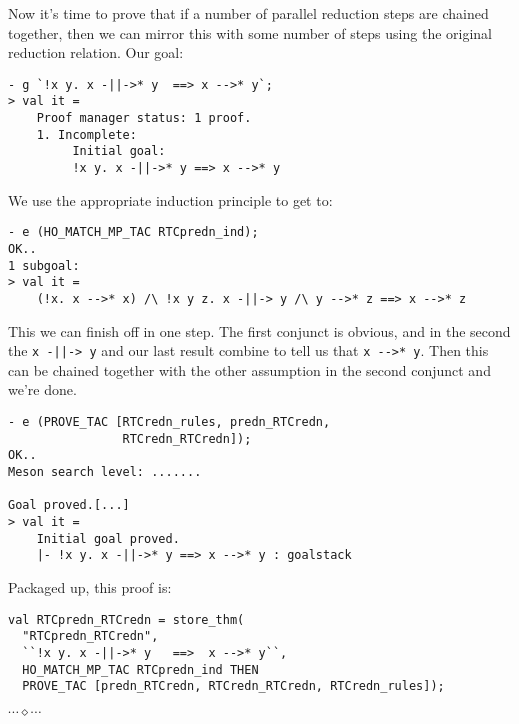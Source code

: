 \documentclass[12pt]{article}
\newcommand{\eos}{\hfill{}$\cdots\diamond\cdots$\hfill{}\vspace{5mm}}
\begin{document}
Now it's time to prove that if a number of parallel reduction steps
are chained together, then we can mirror this with some number of
steps using the original reduction relation.  Our goal:
\begin{session}\begin{verbatim}
- g `!x y. x -||->* y  ==> x -->* y`;
> val it =
    Proof manager status: 1 proof.
    1. Incomplete:
         Initial goal:
         !x y. x -||->* y ==> x -->* y
\end{verbatim}\end{session}
We use the appropriate induction principle to get to:
\begin{session}\begin{verbatim}
- e (HO_MATCH_MP_TAC RTCpredn_ind);
OK..
1 subgoal:
> val it =
    (!x. x -->* x) /\ !x y z. x -||-> y /\ y -->* z ==> x -->* z
\end{verbatim}\end{session}
This we can finish off in one step.  The first conjunct is obvious,
and in the second the \verb!x -||-> y! and our last result combine to
tell us that \verb!x -->* y!.  Then this can be chained together with
the other assumption in the second conjunct and we're done.
\begin{session}\begin{verbatim}
- e (PROVE_TAC [RTCredn_rules, predn_RTCredn,
                RTCredn_RTCredn]);
OK..
Meson search level: .......

Goal proved.[...]
> val it =
    Initial goal proved.
    |- !x y. x -||->* y ==> x -->* y : goalstack
\end{verbatim}\end{session}
Packaged up, this proof is:
\begin{session}\begin{verbatim}
val RTCpredn_RTCredn = store_thm(
  "RTCpredn_RTCredn",
  ``!x y. x -||->* y   ==>  x -->* y``,
  HO_MATCH_MP_TAC RTCpredn_ind THEN
  PROVE_TAC [predn_RTCredn, RTCredn_RTCredn, RTCredn_rules]);
\end{verbatim}\end{session}
\eos{}
\end{document}
